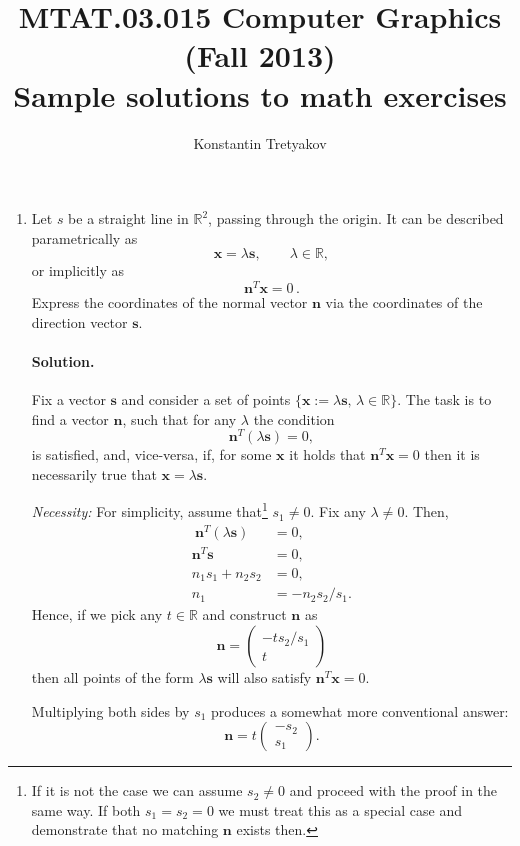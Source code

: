 \documentclass{article}
\newcommand{\bbR}{\mathbb{R}}
\newcommand{\bx}{\mathbf{x}}
\newcommand{\bs}{\mathbf{s}}
\newcommand{\bn}{\mathbf{n}}
\begin{document}
\title{MTAT.03.015 Computer Graphics (Fall 2013)\\
\medskip
\Large Sample solutions to math exercises}
\author{Konstantin Tretyakov}
\date{}
\maketitle


\begin{enumerate}
\item Let $s$ be a straight line in $\bbR^2$, passing through the origin. It can be described parametrically as
$$
\bx = \lambda \bs, \qquad \lambda \in \bbR,
$$
or implicitly as
$$
\bn^T\bx = 0\,.
$$
Express the coordinates of the normal vector $\bn$ via the coordinates of the direction vector $\bs$.

\paragraph{Solution.} Fix a vector $\bs$ and consider a set of points $\{\bx:=\lambda \bs, \, \lambda \in \bbR\}$. The task is to find a vector $\bn$, such that for any $\lambda$ the condition
$$
\bn^T(\lambda \bs) = 0,
$$
is satisfied, and, vice-versa, if, for some $\bx$ it holds that $\bn^T\bx=0$ then it is necessarily true that $\bx = \lambda \bs$.

\emph{Necessity:} For simplicity, assume that\footnote{If it is not the case we can assume $s_2 \neq 0$ and proceed with the proof in the same way. If both $s_1 = s_2 = 0$ we must treat this as a special case and demonstrate that no matching $\bn$ exists then.}  $s_1 \neq 0$. Fix any $\lambda\neq 0$. Then,
\begin{align*}\
\bn^T(\lambda \bs) &= 0,\\
\bn^T\bs &=0,\\
n_1 s_1 + n_2s_2 &= 0,\\
n_1 &= -n_2s_2/s_1.
\end{align*}
Hence, if we pick any $t \in \bbR$ and construct $\bn$ as
$$
\bn = \left(\begin{array}{c} -ts_2/s_1 \\ t \end{array}\right)
$$
then all points of the form $\lambda \bs$ will also satisfy $\bn^T\bx = 0$.

Multiplying both sides by $s_1$ produces a somewhat more conventional answer:
$$
\bn = t\left(\begin{array}{c} -s_2 \\ s_1 \end{array}\right).
$$


\end{enumerate}
\end{document}
